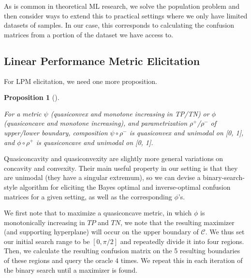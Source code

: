\documentclass[
  letterpaper,
  numbers=noenddot,
  DIV=11]{scrreprt}
\theoremstyle{definition}
\theoremstyle{plain}
\newtheorem{proposition}{Proposition}[chapter]
\theoremstyle{plain}
\theoremstyle{remark}
\begin{document}
As is common in theoretical ML research, we solve the population problem
and then consider ways to extend this to practical settings where we
only have limited datasets of samples. In our case, this corresponds to
calculating the confusion matrices from a portion of the dataset we have
access to.

\subsection{Linear Performance Metric Elicitation}\label{sec-orgb6dac4e}

For LPM elicitation, we need one more proposition.

\begin{tcolorbox}[colframe=.grey, title=\faPenSquare \enspace Proposition]

\begin{proposition}[]\protect\hypertarget{prp-prp3.2}{}\label{prp-prp3.2}

For a metric \(\psi\) (quasiconvex and monotone increasing in TP/TN) or
\(\phi\) (quasiconcave and monotone increasing), and parametrization
\(\rho^+\)/\(\rho^-\) of upper/lower boundary, composition
\(\psi \circ \rho^-\) is quasiconvex and unimodal on {[}0, 1{]}, and
\(\phi \circ \rho^+\) is quasiconcave and unimodal on {[}0, 1{]}.

\end{proposition}

\end{tcolorbox}

Quasiconcavity and quasiconvexity are slightly more general variations
on concavity and convexity. Their main useful property in our setting is
that they are unimodal (they have a singular extremum), so we can devise
a binary-search-style algorithm for eliciting the Bayes optimal and
inverse-optimal confusion matrices for a given setting, as well as the
corresponding \(\phi\)'s.

We first note that to maximize a quasiconcave metric, in which \(\phi\)
is monotonically increasing in \(TP\) and \(TN\), we note that the
resulting maximizer (and supporting hyperplane) will occur on the upper
boundary of \(\mathcal{C}\). We thus set our initial search range to be
\([0, \pi/2]\) and repeatedly divide it into four regions. Then, we
calculate the resulting confusion matrix on the 5 resulting boundaries
of these regions and query the oracle \(4\) times. We repeat this in
each iteration of the binary search until a maximizer is found.
\end{document}
